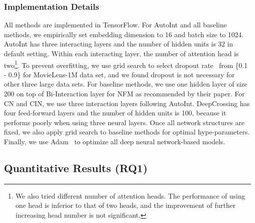\subsubsection{Implementation Details}\label{sec::impl}
All methods are implemented in TensorFlow\cite{abadi2016tensorflow}. For AutoInt and all baseline methods, we empirically set embedding dimension  to 16 and batch size to 1024. AutoInt has three interacting layers and the number of hidden units  is 32 in default setting. Within each interacting layer, the number of attention head is two\footnote{We also tried different number of attention heads. The performance of using one head is inferior to that of two heads, and the improvement of further increasing head number is not significant.}. To prevent overfitting, we use grid search to select dropout rate~\cite{srivastava2014dropout} from \{0.1 - 0.9\} for MovieLens-1M data set, and we found dropout is not necessary for other three large data sets.
For baseline methods, we use one hidden layer of size 200 on top of Bi-Interaction layer for NFM as recommended by their paper. For CN and CIN, we use three interaction layers following AutoInt.  DeepCrossing has four feed-forward layers and the number of hidden units is 100, because it performs poorly when using three neural layers. Once all network structures are fixed, we also apply grid search to baseline methods for optimal hype-parameters. 
Finally, we use Adam~\cite{kingma2014adam} to optimize all deep neural network-based models.

\subsection{Quantitative Results (RQ1)}\label{sec::result}

